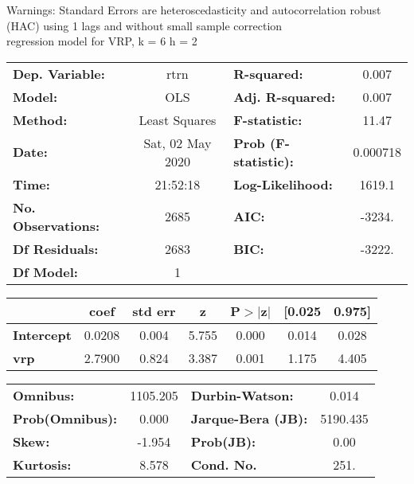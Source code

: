 Warnings: \newline
 [1] Standard Errors are heteroscedasticity and autocorrelation robust (HAC) using 1 lags and without small sample correction\\ 

regression model for VRP, k = 6 h = 2\begin{center}
\begin{tabular}{lclc}
\toprule
\textbf{Dep. Variable:}    &       rtrn       & \textbf{  R-squared:         } &     0.007   \\
\textbf{Model:}            &       OLS        & \textbf{  Adj. R-squared:    } &     0.007   \\
\textbf{Method:}           &  Least Squares   & \textbf{  F-statistic:       } &     11.47   \\
\textbf{Date:}             & Sat, 02 May 2020 & \textbf{  Prob (F-statistic):} &  0.000718   \\
\textbf{Time:}             &     21:52:18     & \textbf{  Log-Likelihood:    } &    1619.1   \\
\textbf{No. Observations:} &        2685      & \textbf{  AIC:               } &    -3234.   \\
\textbf{Df Residuals:}     &        2683      & \textbf{  BIC:               } &    -3222.   \\
\textbf{Df Model:}         &           1      & \textbf{                     } &             \\
\bottomrule
\end{tabular}
\begin{tabular}{lcccccc}
                   & \textbf{coef} & \textbf{std err} & \textbf{z} & \textbf{P$> |$z$|$} & \textbf{[0.025} & \textbf{0.975]}  \\
\midrule
\textbf{Intercept} &       0.0208  &        0.004     &     5.755  &         0.000        &        0.014    &        0.028     \\
\textbf{vrp}       &       2.7900  &        0.824     &     3.387  &         0.001        &        1.175    &        4.405     \\
\bottomrule
\end{tabular}
\begin{tabular}{lclc}
\textbf{Omnibus:}       & 1105.205 & \textbf{  Durbin-Watson:     } &    0.014  \\
\textbf{Prob(Omnibus):} &   0.000  & \textbf{  Jarque-Bera (JB):  } & 5190.435  \\
\textbf{Skew:}          &  -1.954  & \textbf{  Prob(JB):          } &     0.00  \\
\textbf{Kurtosis:}      &   8.578  & \textbf{  Cond. No.          } &     251.  \\
\bottomrule
\end{tabular}
\end{center}

